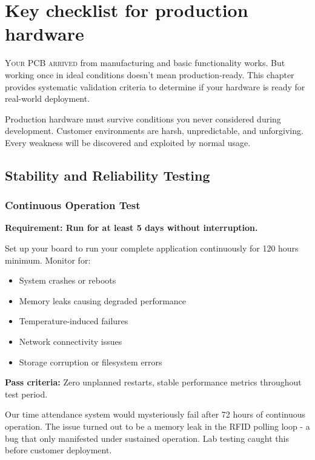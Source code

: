 \chapter{Key checklist for production hardware}

\lettrine{Y}{our PCB arrived} from manufacturing and basic functionality works. But working once in ideal conditions doesn't mean production-ready. This chapter provides systematic validation criteria to determine if your hardware is ready for real-world deployment.

Production hardware must survive conditions you never considered during development. Customer environments are harsh, unpredictable, and unforgiving. Every weakness will be discovered and exploited by normal usage.

\section{Stability and Reliability Testing}

\subsection{Continuous Operation Test}

\textbf{Requirement: Run for at least 5 days without interruption.}

Set up your board to run your complete application continuously for 120 hours minimum. Monitor for:
\begin{itemize}
\item System crashes or reboots
\item Memory leaks causing degraded performance
\item Temperature-induced failures
\item Network connectivity issues
\item Storage corruption or filesystem errors
\end{itemize}

\textbf{Pass criteria:} Zero unplanned restarts, stable performance metrics throughout test period.

\begin{tcolorbox}[colback=yellow!10,colframe=orange!75!black,title=Real-World Example]
Our time attendance system would mysteriously fail after 72 hours of continuous operation. The issue turned out to be a memory leak in the RFID polling loop - a bug that only manifested under sustained operation. Lab testing caught this before customer deployment.
\end{tcolorbox}


